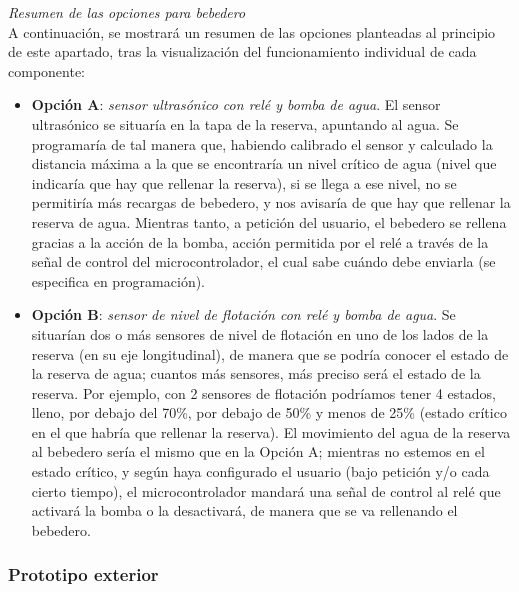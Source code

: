 \documentclass[12pt]{article}
\begin{document}
	\noindent \textit{Resumen de las opciones para bebedero}
	 \\
	 
	 \noindent A continuación, se mostrará un resumen de las opciones planteadas al principio de este apartado, tras la visualización del funcionamiento individual de cada componente:
	 
	 \begin{itemize}
	 	\item \textbf{Opción A}: \textit{sensor ultrasónico con relé y bomba de agua}. El sensor ultrasónico se situaría en la tapa de la reserva, apuntando al agua. Se programaría de tal manera que, habiendo calibrado el sensor y calculado la distancia máxima a la que se encontraría un nivel crítico de agua (nivel que indicaría que hay que rellenar la reserva), si se llega a ese nivel, no se permitiría más recargas de bebedero, y nos avisaría de que hay que rellenar la reserva de agua. Mientras tanto, a petición del usuario, el bebedero se rellena gracias a la acción de la bomba, acción permitida por el relé a través de la señal de control del microcontrolador, el cual sabe cuándo debe enviarla (se especifica en programación).
	 	\item \textbf{Opción B}: \textit{sensor de nivel de flotación con relé y bomba de agua}. Se situarían dos o más sensores de nivel de flotación en uno de los lados de la reserva (en su eje longitudinal), de manera que se podría conocer el estado de la reserva de agua; cuantos más sensores, más preciso será el estado de la reserva. Por ejemplo, con 2 sensores de flotación podríamos tener 4 estados, lleno, por debajo del 70\%, por debajo de 50\% y menos de 25\% (estado crítico en el que habría que rellenar la reserva). El movimiento del agua de la reserva al bebedero sería el mismo que en la Opción A; mientras no estemos en el estado crítico, y según haya configurado el usuario (bajo petición y/o cada cierto tiempo), el microcontrolador mandará una señal de control al relé que activará la bomba o la desactivará, de manera que se va rellenando el bebedero.
	 \end{itemize}
	
	
	\subsubsection{Prototipo exterior}
	
\end{document}
